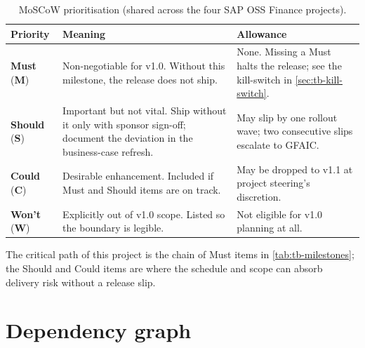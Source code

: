 \begin{table}[htbp]
\centering
\caption{MoSCoW prioritisation (shared across the four SAP OSS Finance
projects).}
\label{tab:tb-moscow}
\footnotesize
\begin{tabularx}{\linewidth}{@{}l l X@{}}
\toprule
\textbf{Priority} & \textbf{Meaning} & \textbf{Allowance} \\ \midrule
\textbf{Must} (\textbf{M}) & Non-negotiable for v1.0. Without this milestone, the release does not ship. & None. Missing a Must halts the release; see the kill-switch in \cref{sec:tb-kill-switch}. \\
\textbf{Should} (\textbf{S}) & Important but not vital. Ship without it only with sponsor sign-off; document the deviation in the business-case refresh. & May slip by one rollout wave; two consecutive slips escalate to GFAIC. \\
\textbf{Could} (\textbf{C}) & Desirable enhancement. Included if Must and Should items are on track. & May be dropped to v1.1 at project steering's discretion. \\
\textbf{Won't} (\textbf{W}) & Explicitly out of v1.0 scope. Listed so the boundary is legible. & Not eligible for v1.0 planning at all. \\
\bottomrule
\end{tabularx}
\end{table}

\noindent
The critical path of this project is the chain of Must items in
\cref{tab:tb-milestones}; the Should and Could items are where the
schedule and scope can absorb delivery risk without a release slip.

\section{Dependency graph}\label{sec:tb-dependency-graph}

